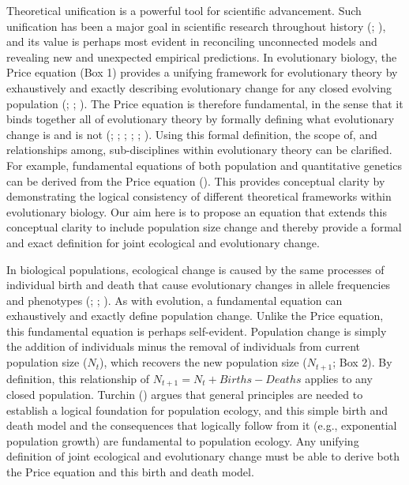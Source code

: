 \documentclass[
]{article}
\begin{document}
Theoretical unification is a powerful tool for scientific advancement.
Such unification has been a major goal in scientific research throughout
history (;
), and its value is perhaps most
evident in reconciling unconnected models and revealing new and
unexpected empirical predictions. In evolutionary biology, the Price
equation (Box 1) provides a unifying framework for evolutionary theory
by exhaustively and exactly describing evolutionary change for any
closed evolving population (;
;
). The Price equation
is therefore fundamental, in the sense that it binds together all of
evolutionary theory by formally defining what evolutionary change is and
is not (;
; ; ;
; ). Using this formal definition, the scope of, and
relationships among, sub-disciplines within evolutionary theory can be
clarified. For example, fundamental equations of both population and
quantitative genetics can be derived from the Price equation
(). This provides conceptual
clarity by demonstrating the logical consistency of different
theoretical frameworks within evolutionary biology. Our aim here is to
propose an equation that extends this conceptual clarity to include
population size change and thereby provide a formal and exact definition
for joint ecological and evolutionary change.

In biological populations, ecological change is caused by the same
processes of individual birth and death that cause evolutionary changes
in allele frequencies and phenotypes (; ;
). As with evolution, a
fundamental equation can exhaustively and exactly define population
change. Unlike the Price equation, this fundamental equation is perhaps
self-evident. Population change is simply the addition of individuals
minus the removal of individuals from current population size
(\(N_{t}\)), which recovers the new population size (\(N_{t+1}\); Box
2). By definition, this relationship of
\(N_{t+1} = N_{t} + Births - Deaths\) applies to any closed population.
Turchin () argues that general
principles are needed to establish a logical foundation for population
ecology, and this simple birth and death model and the consequences that
logically follow from it (e.g., exponential population growth) are
fundamental to population ecology. Any unifying definition of joint
ecological and evolutionary change must be able to derive both the Price
equation and this birth and death model.
\end{document}
